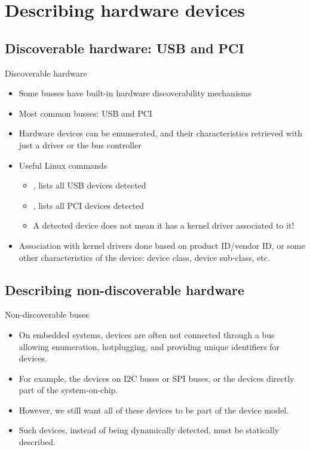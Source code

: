 \section{Describing hardware devices}

\subsection{Discoverable hardware: USB and PCI}

\begin{frame}{Discoverable hardware}
  \begin{itemize}
  \item Some busses have built-in hardware discoverability mechanisms
  \item Most common busses: USB and PCI
  \item Hardware devices can be enumerated, and their characteristics
    retrieved with just a driver or the bus controller
  \item Useful Linux commands
    \begin{itemize}
    \item {}, lists all USB devices detected
    \item {}, lists all PCI devices detected
    \item A detected device does not mean it has a kernel driver
      associated to it!
    \end{itemize}
  \item Association with kernel drivers done based on product
    ID/vendor ID, or some other characteristics of the device: device
    class, device sub-class, etc.
  \end{itemize}
\end{frame}

\subsection{Describing non-discoverable hardware}

\begin{frame}{Non-discoverable buses}
  \begin{itemize}
  \item On embedded systems, devices are often not connected through a
    bus allowing enumeration, hotplugging, and providing unique
    identifiers for devices.
  \item For example, the devices on I2C buses or SPI buses, or the
    devices directly part of the system-on-chip.
  \item However, we still want all of these devices to be part of the
    device model.
  \item Such devices, instead of being dynamically detected, must be
    statically described.
  \end{itemize}
\end{frame}

